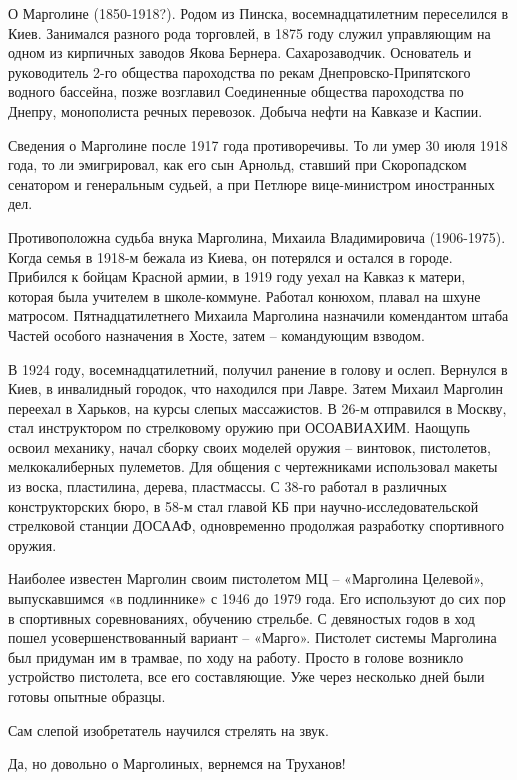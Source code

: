 О Марголине (1850-1918?). Родом из Пинска, восемнадцатилетним переселился в Киев. Занимался разного рода торговлей, в 1875 году служил управляющим на одном из кирпичных заводов Якова Бернера. Сахарозаводчик. Основатель и руководитель 2-го общества пароходства по рекам Днепровско-Припятского водного бассейна, позже возглавил Соединенные общества пароходства по Днепру, монополиста речных перевозок. Добыча нефти на Кавказе и Каспии. 

Сведения о Марголине после 1917 года противоречивы. То ли умер 30 июля 1918 года, то ли эмигрировал, как его сын Арнольд, ставший при Скоропадском сенатором и генеральным судьей, а при Петлюре вице-министром иностранных дел.

Противоположна судьба внука Марголина, Михаила Владимировича (1906-1975). Когда семья в 1918-м бежала из Киева, он потерялся и остался в городе. Прибился к бойцам Красной армии, в 1919 году уехал на Кавказ к матери, которая была учителем в школе-коммуне. Работал конюхом, плавал на шхуне матросом. Пятнадцатилетнего Михаила Марголина назначили комендантом штаба Частей особого назначения в Хосте, затем – командующим взводом. 

В 1924 году, восемнадцатилетний, получил ранение в голову и ослеп. Вернулся в Киев, в инвалидный городок, что находился при Лавре. Затем Михаил Марголин переехал в Харьков, на курсы слепых массажистов. В 26-м отправился в Москву, стал инструктором по стрелковому оружию при ОСОАВИАХИМ. Наощупь освоил механику, начал сборку своих моделей оружия – винтовок, пистолетов, мелкокалиберных пулеметов. Для общения с чертежниками использовал макеты из воска, пластилина, дерева, пластмассы. С 38-го работал в различных конструкторских бюро, в 58-м стал главой КБ при научно-исследовательской стрелковой станции ДОСААФ, одновременно продолжая разработку спортивного оружия.

Наиболее известен Марголин своим пистолетом МЦ – «Марголина Целевой», выпускавшимся «в подлиннике» с 1946 до 1979 года. Его используют до сих пор в спортивных соревнованиях, обучению стрельбе. С девяностых годов в ход пошел усовершенствованный вариант – «Марго». Пистолет системы Марголина был придуман им в трамвае, по ходу на работу. Просто в голове возникло устройство пистолета, все его составляющие. Уже через несколько дней были готовы опытные образцы.

Сам слепой изобретатель научился стрелять на звук.

Да, но довольно о Марголиных, вернемся на Труханов!

